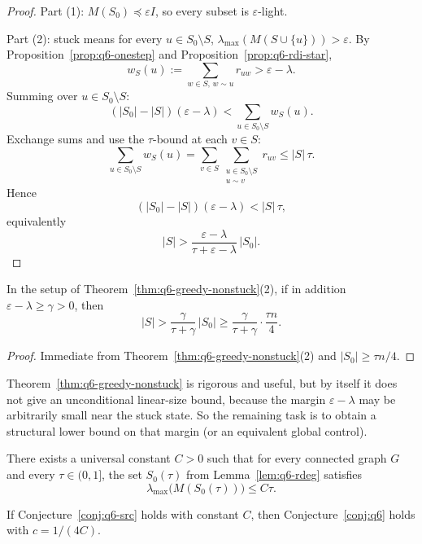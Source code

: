 \begin{proof}
Part (1): $M(S_0)\preceq \varepsilon I$, so every subset is
$\varepsilon$-light.

Part (2): stuck means for every $u\in S_0\setminus S$,
$\lambda_{\max}(M(S\cup\{u\}))>\varepsilon$.
By Proposition~\ref{prop:q6-onestep} and
Proposition~\ref{prop:q6-rdi-star},
\[
w_S(u):=\sum_{w\in S,\,w\sim u}r_{uw}>\varepsilon-\lambda.
\]
Summing over $u\in S_0\setminus S$:
\[
(|S_0|-|S|)(\varepsilon-\lambda)
<
\sum_{u\in S_0\setminus S}w_S(u).
\]
Exchange sums and use the $\tau$-bound at each $v\in S$:
\[
\sum_{u\in S_0\setminus S}w_S(u)
=
\sum_{v\in S}\sum_{\substack{u\in S_0\setminus S\\u\sim v}}r_{uv}
\le
|S|\,\tau.
\]
Hence
\[
(|S_0|-|S|)(\varepsilon-\lambda)<|S|\,\tau,
\]
equivalently
\[
|S|>\frac{\varepsilon-\lambda}{\tau+\varepsilon-\lambda}\,|S_0|.
\]
\end{proof}

\begin{corollary}
\label{cor:q6-greedy-margin}
In the setup of Theorem~\ref{thm:q6-greedy-nonstuck}(2), if in addition
$\varepsilon-\lambda\ge\gamma>0$, then
\[
|S|>\frac{\gamma}{\tau+\gamma}\,|S_0|
\ge
\frac{\gamma}{\tau+\gamma}\cdot\frac{\tau n}{4}.
\]
\end{corollary}

\begin{proof}
Immediate from Theorem~\ref{thm:q6-greedy-nonstuck}(2) and
$|S_0|\ge\tau n/4$.
\end{proof}

\begin{remark}
Theorem~\ref{thm:q6-greedy-nonstuck} is rigorous and useful, but by
itself it does not give an unconditional linear-size bound, because the
margin $\varepsilon-\lambda$ may be arbitrarily small near the stuck
state.
So the remaining task is to obtain a structural lower bound on that
margin (or an equivalent global control).
\end{remark}

\begin{conjecture}
\label{conj:q6-src}
There exists a universal constant $C>0$ such that for every connected
graph $G$ and every $\tau\in(0,1]$, the set $S_0(\tau)$ from
Lemma~\ref{lem:q6-rdeg} satisfies
\[
\lambda_{\max}\!\bigl(M(S_0(\tau))\bigr)\le C\tau.
\]
\end{conjecture}

\begin{theorem}\label{thm:q6-src-implies}
If Conjecture~\ref{conj:q6-src} holds with constant $C$, then
Conjecture~\ref{conj:q6} holds with $c=1/(4C)$.
\end{theorem}

